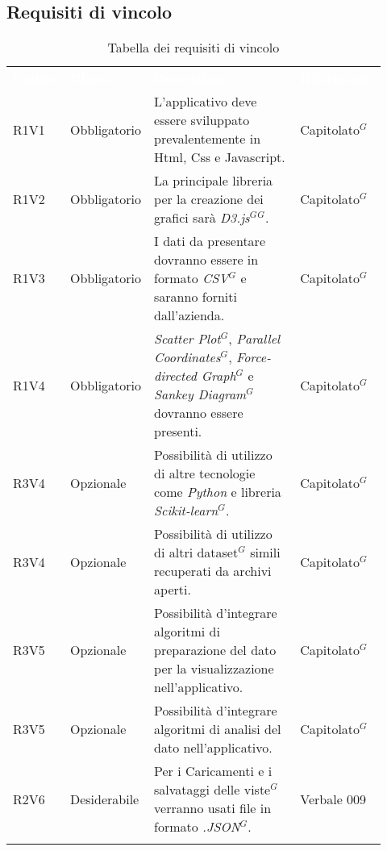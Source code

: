 \subsection{Requisiti di vincolo}
{\renewcommand{\arraystretch}{1.5}
\begin{longtable}{p{0.12\linewidth}p{0.15\linewidth}p{0.50\linewidth}p{0.15\linewidth}}
	\rowcolor[RGB]{33, 73, 50}
	\textcolor{white}{\textbf{Codice}} & \textcolor{white}{\textbf{Classe}} & \textcolor{white}{\textbf{Descrizione}} &
    \textcolor{white}{\textbf{Riferimenti}}\\

    \rowcolor[RGB]{216, 235, 171}
    R1V1 & Obbligatorio & L'applicativo deve essere sviluppato prevalentemente in Html, Css e Javascript. & Capitolato$^{G}$\\
    \rowcolor[RGB]{233, 245, 206}
    R1V2 & Obbligatorio & La principale libreria per la creazione dei grafici sarà \textit{D3.js$^{G}$}$^{G}$. & Capitolato$^{G}$\\
    \rowcolor[RGB]{216, 235, 171}
    R1V3 & Obbligatorio & I dati da presentare dovranno essere in formato \textit{CSV}$^{G}$ e saranno forniti dall'azienda.& Capitolato$^{G}$\\
    \rowcolor[RGB]{233, 245, 206}
    R1V4 & Obbligatorio & \textit{Scatter Plot}$^{G}$, \textit{Parallel Coordinates}$^{G}$, \textit{Force-directed Graph}$^{G}$ e \textit{Sankey Diagram}$^{G}$ dovranno essere presenti.& Capitolato$^{G}$\\
    \rowcolor[RGB]{216, 235, 171}
    R3V4 & Opzionale & Possibilità di utilizzo di altre tecnologie come \textit{Python} e libreria \textit{Scikit-learn}$^{G}$.& Capitolato$^{G}$\\
    \rowcolor[RGB]{233, 245, 206}
    R3V4 & Opzionale & Possibilità di utilizzo di altri dataset$^{G}$ simili recuperati da archivi aperti. & Capitolato$^{G}$ \\
    \rowcolor[RGB]{216, 235, 171}
    R3V5 & Opzionale & Possibilità d'integrare algoritmi di preparazione del dato per la visualizzazione nell'applicativo. & Capitolato$^{G}$\\
    \rowcolor[RGB]{233, 245, 206}
    R3V5 & Opzionale & Possibilità d'integrare algoritmi di analisi del dato nell'applicativo. & Capitolato$^{G}$\\
    \rowcolor[RGB]{216, 235, 171}
    R2V6 & Desiderabile & Per i Caricamenti e i salvataggi delle viste$^{G}$ verranno usati file in formato \textit{.JSON}$^{G}$. & Verbale 009\\

    \caption{Tabella dei requisiti di vincolo}
\end{longtable}
}

